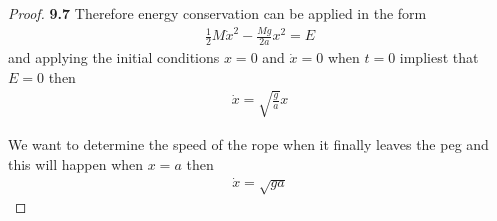 \documentclass[11pt]{article}
\theoremstyle{definition}
\begin{document}
\begin{proof}{\textbf{9.7}}
        Therefore energy conservation can be applied in the form
        \begin{align*}
            \frac{1}{2}M\dot{x}^2 - \frac{Mg}{2a}x^2 = E
        \end{align*}
        and applying the initial conditions $x=0$ and $\dot{x} = 0$ when 
        $t=0$ impliest that $E = 0$ then
        \begin{align*}
            \dot{x} = \sqrt{\frac{g}{a}}x
        \end{align*}

        We want to determine the speed of the rope when it finally leaves the
        peg and this will happen when $x = a$ then
        \begin{align*}
            \dot{x} = \sqrt{ga}
        \end{align*}
    \end{proof}
\cleardoublepage
\end{document}
